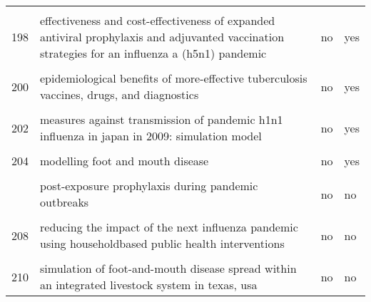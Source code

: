 \documentclass[
]{article}
\begin{document}
\begin{landscape}
\begin{longtable}{l>{\raggedright\arraybackslash}p{4cm}l>{\raggedright\arraybackslash}p{4cm}}
\cellcolor{gray!6}{197} & \cellcolor{gray!6}{economic evaluation of influenza pandemic mitigation strategies in the united states using a stochastic microsimulation transmission model} & \cellcolor{gray!6}{no} & \cellcolor{gray!6}{yes}\\
198 & effectiveness and cost-effectiveness of expanded antiviral prophylaxis and adjuvanted vaccination strategies for an influenza a (h5n1) pandemic & no & yes\\
\cellcolor{gray!6}{199} & \cellcolor{gray!6}{engineering responses to pandemics} & \cellcolor{gray!6}{no} & \cellcolor{gray!6}{no}\\
200 & epidemiological benefits of more-effective tuberculosis vaccines, drugs, and diagnostics & no & yes\\
\addlinespace
\cellcolor{gray!6}{201} & \cellcolor{gray!6}{household epidemics: modelling effects of early stage vaccination} & \cellcolor{gray!6}{no} & \cellcolor{gray!6}{yes}\\
202 & measures against transmission of pandemic h1n1 influenza in japan in 2009: simulation model & no & yes\\
\cellcolor{gray!6}{203} & \cellcolor{gray!6}{modeling vaccination campaigns and the fall/winter 2009 activity of the new a(h1n1) influenza in the northern hemisphere} & \cellcolor{gray!6}{no} & \cellcolor{gray!6}{yes}\\
204 & modelling foot and mouth disease & no & yes\\
\cellcolor{gray!6}{205} & \cellcolor{gray!6}{modelling of the influenza a(h1n1)v outbreak in mexico city, april-may 2009, with control sanitary measures} & \cellcolor{gray!6}{no} & \cellcolor{gray!6}{no}\\
\addlinespace
206 & post-exposure prophylaxis during pandemic outbreaks & no & no\\
\cellcolor{gray!6}{207} & \cellcolor{gray!6}{potential for a global dynamic of influenza a (h1n1)} & \cellcolor{gray!6}{no} & \cellcolor{gray!6}{yes}\\
208 & reducing the impact of the next influenza pandemic using householdbased public health interventions & no & no\\
\cellcolor{gray!6}{209} & \cellcolor{gray!6}{seasonal transmission potential and activity peaks of the new influenza a(h1n1): a monte carlo likelihood analysis based on human mobility} & \cellcolor{gray!6}{no} & \cellcolor{gray!6}{no}\\
210 & simulation of foot-and-mouth disease spread within an integrated livestock system in texas, usa & no & no\\

\end{longtable}
\end{landscape}
\end{document}
